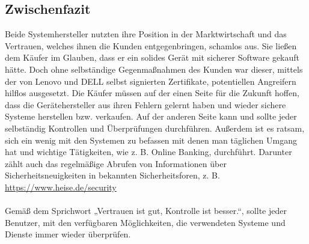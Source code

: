 \subsection{Zwischenfazit}
Beide Systemhersteller nutzten ihre Position in der Marktwirtschaft und das Vertrauen, welches ihnen die Kunden entgegenbringen, schamlos aus. Sie ließen dem Käufer im Glauben, dass er ein solides Gerät mit sicherer Software gekauft hätte. Doch ohne selbständige Gegenmaßnahmen des Kunden war dieser, mittels der von Lenovo und DELL selbst signierten Zertifikate, potentiellen Angreifern hilflos ausgesetzt. Die Käufer müssen auf der einen Seite für die Zukunft hoffen, dass die Gerätehersteller aus ihren Fehlern gelernt haben und wieder sichere Systeme herstellen bzw. verkaufen. Auf der anderen Seite kann und sollte jeder selbständig Kontrollen und Überprüfungen durchführen. Außerdem ist es ratsam, sich ein wenig mit den Systemen zu befassen mit denen man täglichen Umgang hat und wichtige Tätigkeiten, wie z. B. Online Banking, durchführt. Darunter zählt auch das regelmäßige Abrufen von Informationen über Sicherheitsneuigkeiten in bekannten Sicherheitsforen, z. B. \url{https://www.heise.de/security}
\\
\\
Gemäß dem Sprichwort „Vertrauen ist gut, Kontrolle ist besser.“, sollte jeder Benutzer, mit den verfügbaren Möglichkeiten, die verwendeten Systeme und Dienste immer wieder überprüfen.